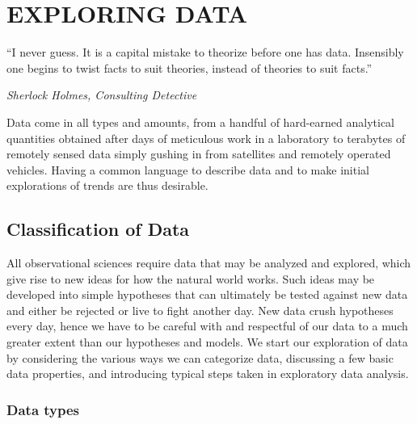 %
\chapter{EXPLORING DATA}
\label{ch:EDA}
\epigraph{``I never guess. It is a capital mistake to theorize before one has data. Insensibly one begins to twist facts to suit theories, instead of theories to suit facts.''}{\textit{Sherlock Holmes, Consulting Detective}}
Data come in all types and amounts, from a handful of hard-earned analytical quantities obtained after days of meticulous
work in a laboratory to terabytes of remotely sensed data simply gushing in from satellites and remotely operated vehicles.
Having a common language to describe data and to make initial explorations of trends are thus desirable.

\section{Classification of Data}
All observational sciences require data that may be analyzed and explored, which give rise to new ideas for
how the natural world works.  Such ideas may be developed into simple hypotheses that can ultimately be tested
against new data and either be rejected or live to fight another day.  New data crush hypotheses every day,
hence we have to be careful with and respectful of our data to a much greater extent than our hypotheses and models.
We start our exploration of data by considering the various ways we can categorize data,
discussing a few basic data properties, and introducing typical steps taken in exploratory data analysis.

\subsection{Data types}

